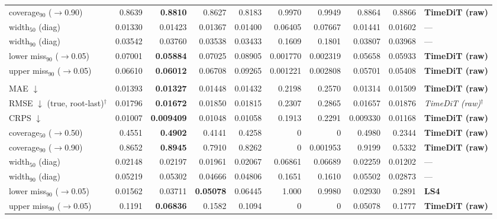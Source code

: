\documentclass[11pt,a4paper]{article}
\begin{document}
\begin{landscape}
\begin{center}
\begin{tabular}{lrrrrrrrrl}
coverage$_{90}$ ($\to$0.90) & 0.8639 & \textbf{0.8810} & 0.8627 & 0.8183 & 0.9970 & 0.9949 & 0.8864 & 0.8866 & \textbf{TimeDiT (raw)} \\
width$_{50}$ (diag) & 0.01330 & 0.01423 & 0.01367 & 0.01400 & 0.06405 & 0.07667 & 0.01441 & 0.01602 & --- \\
width$_{90}$ (diag) & 0.03542 & 0.03760 & 0.03538 & 0.03433 & 0.1609 & 0.1801 & 0.03807 & 0.03968 & --- \\
lower miss$_{90}$ ($\to$0.05) & 0.07001 & \textbf{0.05884} & 0.07025 & 0.08905 & 0.001770 & 0.002319 & 0.05658 & 0.05933 & \textbf{TimeDiT (raw)} \\
upper miss$_{90}$ ($\to$0.05) & 0.06610 & \textbf{0.06012} & 0.06708 & 0.09265 & 0.001221 & 0.002808 & 0.05701 & 0.05408 & \textbf{TimeDiT (raw)} \\
\addlinespace
\multicolumn{10}{l}{\textbf{rv ($M$ scalar)}} \\
MAE $\downarrow$ & 0.01393 & \textbf{0.01327} & 0.01448 & 0.01432 & 0.2198 & 0.2570 & 0.01314 & 0.01509 & \textbf{TimeDiT (raw)} \\
RMSE $\downarrow$ (true, root-last)$^{\dagger}$ & 0.01796 & \textbf{0.01672} & 0.01850 & 0.01815 & 0.2307 & 0.2865 & 0.01657 & 0.01876 & \textit{TimeDiT (raw)}$^{\dagger}$ \\
CRPS $\downarrow$ & 0.01007 & \textbf{0.009409} & 0.01048 & 0.01058 & 0.1913 & 0.2291 & 0.009330 & 0.01168 & \textbf{TimeDiT (raw)} \\
coverage$_{50}$ ($\to$0.50) & 0.4551 & \textbf{0.4902} & 0.4141 & 0.4258 & 0 & 0 & 0.4980 & 0.2344 & \textbf{TimeDiT (raw)} \\
coverage$_{90}$ ($\to$0.90) & 0.8652 & \textbf{0.8945} & 0.7910 & 0.8262 & 0 & 0.001953 & 0.9199 & 0.5332 & \textbf{TimeDiT (raw)} \\
width$_{50}$ (diag) & 0.02148 & 0.02197 & 0.01961 & 0.02067 & 0.06861 & 0.06689 & 0.02259 & 0.01202 & --- \\
width$_{90}$ (diag) & 0.05219 & 0.05302 & 0.04666 & 0.04806 & 0.1651 & 0.1610 & 0.05502 & 0.02873 & --- \\
lower miss$_{90}$ ($\to$0.05) & 0.01562 & 0.03711 & \textbf{0.05078} & 0.06445 & 1.000 & 0.9980 & 0.02930 & 0.2891 & \textbf{LS4} \\
upper miss$_{90}$ ($\to$0.05) & 0.1191 & \textbf{0.06836} & 0.1582 & 0.1094 & 0 & 0 & 0.05078 & 0.1777 & \textbf{TimeDiT (raw)} \\
\bottomrule
\end{tabular}
\end{center}
\end{landscape}
\end{document}
